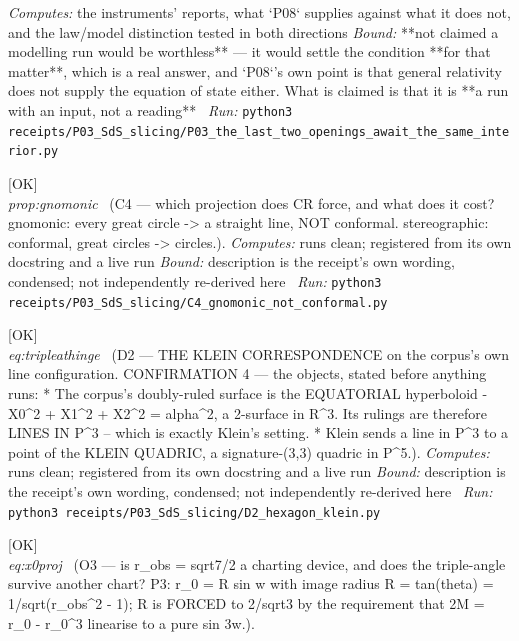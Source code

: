 \begin{description}
\emph{Computes:} the instruments' reports, what `P08` supplies against what it does not, and the law/model distinction tested in both directions
 \emph{Bound:}  **not claimed a modelling run would be worthless** --- it would settle the condition **for that matter**, which is a real answer, and `P08`'s own point is that general relativity does not supply the equation of state either. What is claimed is that it is **a run with an input, not a reading**
\ \emph{Run:} \texttt{python3 receipts/P03\_SdS\_slicing/P03\_the\_last\_two\_openings\_await\_the\_same\_interior.py}
\item[\rcptlabel{C4_gnomonic_not_conformal}{P3R27}\textbf{P3R27}\quad\texttt{C4\_gnomonic\_not\_conformal}]\hfill\textsf{[OK]}\\
\textit{prop:gnomonic} \ (C4 --- which projection does CR force, and what does it cost? gnomonic: every great circle -> a straight line, NOT conformal. stereographic: conformal, great circles -> circles.). 
\emph{Computes:} runs clean; registered from its own docstring and a live run
 \emph{Bound:} description is the receipt's own wording, condensed; not independently re-derived here
\ \emph{Run:} \texttt{python3 receipts/P03\_SdS\_slicing/C4\_gnomonic\_not\_conformal.py}
\item[\rcptlabel{D2_hexagon_klein}{P3R29}\textbf{P3R29}\quad\texttt{D2\_hexagon\_klein}]\hfill\textsf{[OK]}\\
\textit{eq:tripleathinge} \ (D2 --- THE KLEIN CORRESPONDENCE on the corpus's own line configuration. CONFIRMATION 4 --- the objects, stated before anything runs: * The corpus's doubly-ruled surface is the EQUATORIAL hyperboloid -X0\textasciicircum{}2 + X1\textasciicircum{}2 + X2\textasciicircum{}2 = alpha\textasciicircum{}2, a 2-surface in R\textasciicircum{}3. Its rulings are therefore LINES IN P\textasciicircum{}3 -- which is exactly Klein's setting. * Klein sends a line in P\textasciicircum{}3 to a point of the KLEIN QUADRIC, a signature-(3,3) quadric in P\textasciicircum{}5.). 
\emph{Computes:} runs clean; registered from its own docstring and a live run
 \emph{Bound:} description is the receipt's own wording, condensed; not independently re-derived here
\ \emph{Run:} \texttt{python3 receipts/P03\_SdS\_slicing/D2\_hexagon\_klein.py}
\item[\rcptlabel{O3_charting_distance}{P3R30}\textbf{P3R30}\quad\texttt{O3\_charting\_distance}]\hfill\textsf{[OK]}\\
\textit{eq:x0proj} \ (O3 --- is r\_obs = sqrt7/2 a charting device, and does the triple-angle survive another chart? P3: r\_0 = R sin w with image radius R = tan(theta) = 1/sqrt(r\_obs\textasciicircum{}2 - 1); R is FORCED to 2/sqrt3 by the requirement that 2M = r\_0 - r\_0\textasciicircum{}3 linearise to a pure sin 3w.). 

\end{description}
